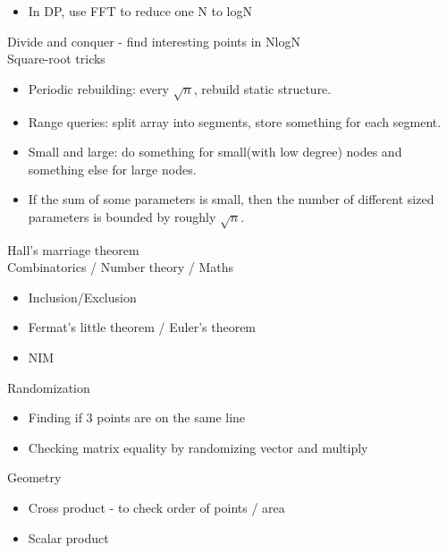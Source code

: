 \documentclass[8pt,a4paper,landscape,oneside]{amsart}
\begin{document}
\begin{multicols*}{2}
\begin{large}
\begin{itemize}
  \item In DP, use FFT to reduce one N to logN
\end{itemize}
Divide and conquer - find interesting points in NlogN\\
Square-root tricks
\begin{itemize}
  \item Periodic rebuilding: every $\sqrt{n}$, rebuild static structure.
  \item Range queries: split array into segments, store something for each segment.
  \item Small and large: do something for small(with low degree) nodes and something else for large nodes.
  \item If the sum of some parameters is small, then the number of different sized parameters is bounded by roughly $\sqrt{n}$.
\end{itemize}
Hall's marriage theorem\\
Combinatorics / Number theory / Maths
\begin{itemize}
  \item Inclusion/Exclusion
  \item Fermat's little theorem / Euler's theorem
  \item NIM
\end{itemize}
Randomization
\begin{itemize}
  \item Finding if 3 points are on the same line
  \item Checking matrix equality by randomizing vector and multiply
\end{itemize}
Geometry
\begin{itemize}
  \item Cross product - to check order of points / area
  \item Scalar product
\end{itemize}
\vspace*{\fill}

\end{large}
\end{multicols*}
\end{document}
